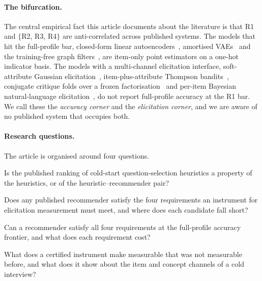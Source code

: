 \documentclass[manuscript,screen]{acmart}
\begin{document}
\paragraph{The bifurcation.} The central empirical fact this article documents about the literature is that R1 and $\{$R2, R3, R4$\}$ are anti-correlated across published systems. The models that hit the full-profile bar, closed-form linear autoencoders~\citep{steck2019ease,steck2020edlae}, amortised VAEs~\citep{liang2018variational,ren2020recvae} and the training-free graph filters~\citep{shen2021gfcf,choi2023bspm,park2024turbocf}, are item-only point estimators on a one-hot indicator basis. The models with a multi-channel elicitation interface, soft-attribute Gaussian elicitation~\citep{biyik2023soft}, item-plus-attribute Thompson bandits~\citep{li2021seamlessly}, conjugate critique folds over a frozen factorisation~\citep{toroghi2023bcie} and per-item Bayesian natural-language elicitation~\citep{austin2024bayesian}, do not report full-profile accuracy at the R1 bar. We call these the \emph{accuracy corner} and the \emph{elicitation corner}, and we are aware of no published system that occupies both.

\paragraph{Research questions.} The article is organised around four questions.
\begin{description}[leftmargin=3.2em,itemsep=2pt]
  \item[RQ1] Is the published ranking of cold-start question-selection heuristics a property of the heuristics, or of the heuristic--recommender pair?
  \item[RQ2] Does any published recommender satisfy the four requirements an instrument for elicitation measurement must meet, and where does each candidate fall short?
  \item[RQ3] Can a recommender satisfy all four requirements at the full-profile accuracy frontier, and what does each requirement cost?
  \item[RQ4] What does a certified instrument make measurable that was not measurable before, and what does it show about the item and concept channels of a cold interview?
\end{description}
\end{document}
